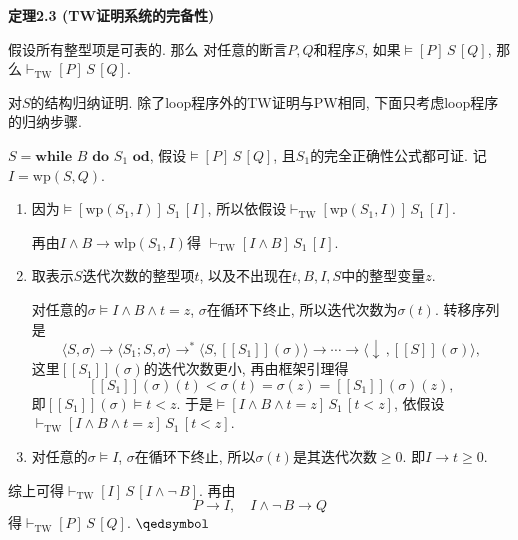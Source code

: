 \documentclass[UTF8]{ctexart}
\begin{document}
\hypertarget{sec:定理2.3}{}
\noindent\textbf{定理2.3 (TW证明系统的完备性)}

假设所有整型项是可表的. 那么
对任意的断言$P,Q$和程序$S$, 如果$\models[P]\,S\,[Q]$,
那么$\vdash_{\mathrm{TW}}[P]\,S\,[Q]$.


对$S$的结构归纳证明. 除了loop程序外的TW证明与PW相同,
下面只考虑loop程序的归纳步骤.

$S=\mathbf{while}\,\,B\,\,\mathbf{do}\,\,S_1\,\,\mathbf{od}$,
假设$\models[P]\,S\,[Q]$, 且$S_1$的完全正确性公式都可证. 记$I=\mathrm{wp}(S,Q)$.
\vspace{1pt}
\begin{enumerate}
    \item 因为$\models[\mathrm{wp}(S_1,I)]\,S_1\,[I]$,
    所以依假设$\vdash_{\mathrm{TW}}[\mathrm{wp}(S_1,I)]\,S_1\,[I]$.

    \hspace{2.17em}
    再由$I\land B\to\mathrm{wlp}(S_1,I)$得
    $\vdash_{\mathrm{TW}}[I\land B]\,S_1\,[I]$.

    \item 取表示$S$迭代次数的整型项$t$, 以及不出现在$t,B,I,S$中的整型变量$z$.
    
    \hspace{2.17em}
    对任意的$\sigma\models I\land B\land t=z$, $\sigma$在循环下终止,
    所以迭代次数为$\sigma(t)$. 转移序列是
    \[
        \langle S,\sigma\rangle\to\langle S_1;S,\sigma\rangle\to^*
        \langle S,[\![S_1]\!](\sigma)\rangle\to\cdots\to
        \langle\downarrow\,,[\![S]\!](\sigma)\rangle,
    \]
    这里$[\![S_1]\!](\sigma)$的迭代次数更小, 再由框架引理得
    \[
        [\![S_1]\!](\sigma)(t)<\sigma(t)=\sigma(z)=[\![S_1]\!](\sigma)(z),
    \]
    即$[\![S_1]\!](\sigma)\models t<z$. 于是$\models[I\land B\land t=z]\,S_1\,
    [t<z]$, 依假设$\vdash_{\mathrm{TW}}[I\land B\land t=z]\,S_1\,[t<z]$.

    \item 对任意的$\sigma\models I$, $\sigma$在循环下终止,
    所以$\sigma(t)$是其迭代次数$\geqslant 0$. 即$I\to t\geqslant 0$.
\end{enumerate}

\vspace{3pt}
综上可得$\vdash_{\mathrm{TW}}[I]\,S\,[I\land\neg\,B]$. 再由
\[
    P\to I,\quad I\land\neg\,B\to Q
\]
得$\vdash_{\mathrm{TW}}[P]\,S\,[Q]$. \hfill $\qedsymbol$
\end{document}
